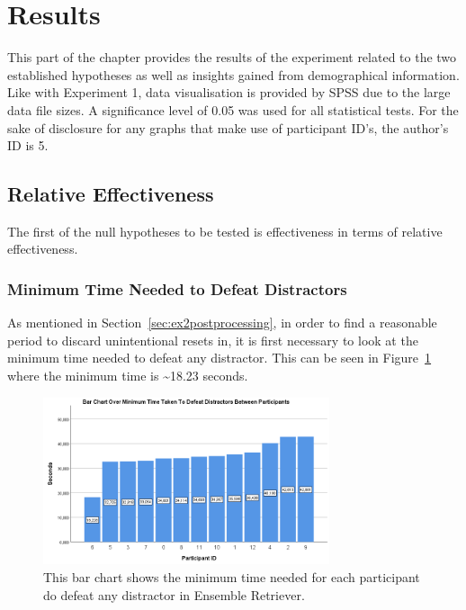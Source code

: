 \section{Results}
This part of the chapter provides the results of the experiment related to the two established hypotheses as well as insights gained from demographical information. Like with Experiment 1, data visualisation is provided by SPSS due to the large data file sizes. A significance level of 0.05 was used for all statistical tests. For the sake of disclosure for any graphs that make use of participant ID's, the author's ID is 5. 

\subsection{Relative Effectiveness}
The first of the null hypotheses to be tested is effectiveness in terms of relative effectiveness. 

\subsubsection{Minimum Time Needed to Defeat Distractors}
As mentioned in Section~\ref{sec:ex2postprocessing}, in order to find a reasonable period to discard unintentional resets in, it is first necessary to look at the minimum time needed to defeat any distractor. This can be seen in Figure~\ref{fig:minDistractorDefeatTime} where the minimum time is \textasciitilde18.23 seconds.

\begin{figure}[tbph]
    \centering
    \includegraphics[width=0.75\textwidth]{figures/graphs/MinDistractorDefeatTime.png}
    \caption[Minimum Time Needed To Defeat Distractors Between Participants]{This bar chart shows the minimum time needed for each participant do defeat any distractor in Ensemble Retriever.}
    \label{fig:minDistractorDefeatTime}
\end{figure}

